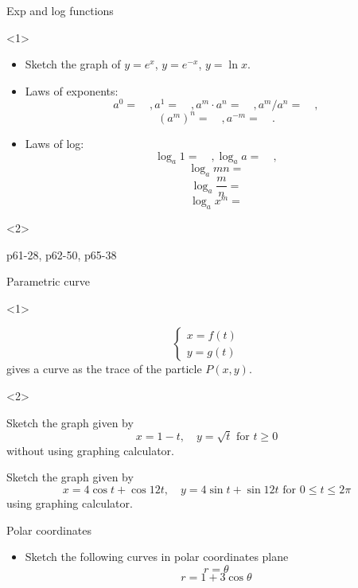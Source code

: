 \begin{frame}{Exp and log functions}

\begin{onlyenv}<1>

\begin{itemize}
\item Sketch the graph of $y=e^{x}$, $y=e^{-x}$, $y=\ln x$.
\item Laws of exponents:
\[
a^{0}=\quad,a^{1}=\quad,a^{m}\cdot a^{n}=\quad,a^{m}/a^{n}=\quad,
\]
\[
\left(a^{m}\right)^{n}=\quad,a^{-m}=\quad.
\]

\item Laws of log:
\[
\log_{a}1=\quad,\log_{a}a=\quad,
\]
\[
\log_{a}mn=
\]
\[
\log_{a}\frac{m}{n}=
\]
\[
\log_{a}x^{m}=
\]

\end{itemize}
\end{onlyenv}



\begin{onlyenv}<2>

\begin{example}
p61-28, p62-50, p65-38
\end{example}

\end{onlyenv}

\end{frame}

\begin{frame}{Parametric curve}

\begin{onlyenv}<1>


\[
\begin{cases}
x=f\left(t\right)\\
y=g\left(t\right)
\end{cases}
\]
gives a curve as the trace of the particle $P\left(x,y\right)$.

\end{onlyenv}



\begin{onlyenv}<2>

\begin{example}
Sketch the graph given by
\[
x=1-t,\quad y=\sqrt{t}\mbox{ for }t\ge0
\]
without using graphing calculator.
\end{example}



\begin{example}
Sketch the graph given by
\[
x=4\cos t+\cos12t,\quad y=4\sin t+\sin12t\mbox{ for }0\le t\le2\pi
\]
using graphing calculator.
\end{example}

\end{onlyenv}

\end{frame}

\begin{frame}{Polar coordinates}

\begin{itemize}
\item Sketch the following curves in polar coordinates plane
\[
r=\theta
\]
\[
r=1+3\cos\theta
\]

\end{itemize}
\end{frame}
